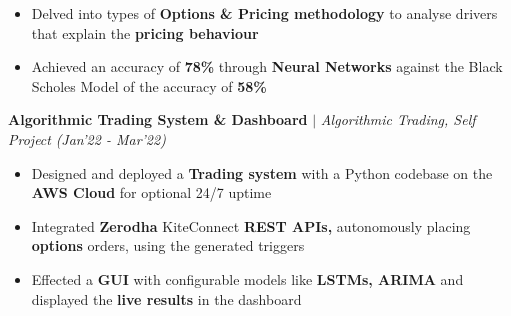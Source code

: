 \documentclass[10pt]{article}
\begin{document}
    \hline 
    \vspace{-3pt}    
\begin{itemize}[label={\textbullet},itemsep = -1 mm, leftmargin=*]
     \item Delved into types of \textbf{Options \& Pricing methodology} to analyse drivers that explain the \textbf{pricing behaviour} 
    \item Achieved an accuracy of \textbf{78\%} through \textbf{Neural Networks} against the Black Scholes Model of the accuracy of \textbf{58\%}
\end{itemize}
\vspace{-6pt}
    \textbf{Algorithmic Trading System \& Dashboard} $|$  \textit{Algorithmic Trading, Self Project} \hfill{\sl \small (Jan’22 - Mar’22)} \\
    \vspace{-0.3cm}
    \hline 
    \vspace{-3pt}    
\begin{itemize}[label={\textbullet},itemsep = -1 mm, leftmargin=*]
    \item Designed and deployed a \textbf{Trading system} with a Python codebase on the \textbf{AWS Cloud} for optional 24/7 uptime
    \item Integrated \textbf{Zerodha} KiteConnect \textbf{REST APIs,} autonomously placing \textbf{options} orders, using the generated triggers
    \item Effected a \textbf{GUI} with configurable models like\textbf{ LSTMs, ARIMA} and displayed the \textbf{live results} in the dashboard  
\end{itemize}
 \vspace{-24pt}
\end{document}
